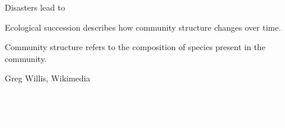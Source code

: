 \documentclass[t]{beamer}
\begin{document}
{
\begin{frame}[t]

	\vspace*{0.2\textheight}

	\hspace*{65mm} \parbox{50mm}{\raggedright Disasters lead to }
	
	\vspace*{\baselineskip}
	
	\hspace*{65mm} \parbox{50mm}{\raggedright Ecological succession describes how community structure changes over time.}

	\vspace*{\baselineskip}
	
	\hspace*{65mm} \parbox{50mm}{\raggedright Community structure refers to the composition of species present in the community.}
	
	\vfilll
	
	\hfill \tiny Greg Willis, Wikimedia 

\end{frame}
}
%

{
\begin{frame}[b]

	\tiny \textcolor{white}{17 May 1980, one day before eruption. \hfill \textsc{usgs}, public domain}

\end{frame}
}
%
{
\begin{frame}[b]

	\tiny \textcolor{white}{Some time after the eruption. \hfill \textsc{usgs}, public domain}

\end{frame}
}
%
\end{document}
